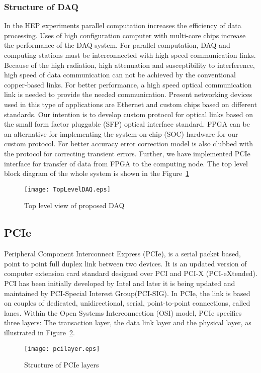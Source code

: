 \documentclass[10pt, conference, compsocconf]{IEEEtran}
\begin{document}
\subsubsection{Structure of DAQ}
In the HEP experiments parallel computation increases the efficiency of data processing. Uses of high configuration computer with multi-core chips increase the performance of the DAQ system. For parallel computation, DAQ and computing stations must be interconnected with high speed communication links. Because of the high radiation, high attenuation and susceptibility to interference, high speed of data communication can not be achieved by the conventional copper-based links. For better performance, a high speed optical communication link  is needed to provide the needed communication. Present networking devices used in this type of applications are Ethernet and custom chips based on different standards. Our intention is to develop custom protocol for optical links based on the small form factor pluggable (SFP) optical interface standard. FPGA can be an alternative for implementing the system-on-chip (SOC) hardware for our custom protocol. For better accuracy error correction model is also clubbed with the protocol for correcting transient errors. Further, we have implemented PCIe interface for transfer of data from FPGA to the computing node. The top level block diagram of the whole system is shown in the Figure~\ref{fig:TopLevelDAQ}
\begin{figure}[h]
\centering
\texttt{[image: TopLevelDAQ.eps]}
\caption{Top level view of proposed DAQ}
\vspace*{-8pt}
\label{fig:TopLevelDAQ}
\end{figure}
\subsection{PCIe}
Peripheral Component Interconnect Express (PCIe), is a  serial packet based, point to point full duplex link between two devices. It is an updated version of computer extension card standard designed over PCI and PCI-X (PCI-eXtended). PCI has been initially developed by Intel and later it is being updated and maintained by PCI-Special Interest Group(PCI-SIG). In PCIe, the link is based on couples of dedicated, unidirectional, serial, point-to-point connections, called lanes. Within the Open Systems Interconnection (OSI) model, PCIe specifies three layers: The transaction layer, the data link layer and the physical layer, as illustrated in Figure~\ref{fig:pcilayer}.
\begin{figure}[h]
\centering
\texttt{[image: pcilayer.eps]}
\vspace*{-8pt}
\caption{Structure of PCIe layers}
\label{fig:pcilayer}
\end{figure}
\end{document}
